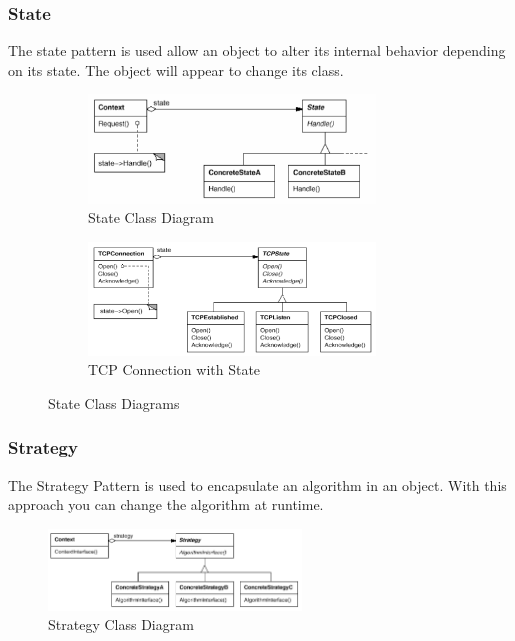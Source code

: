 \documentclass[11pt]{article}
\begin{document}
\subsubsection{State}
\label{sec:orgd97de8c}

The state pattern is used allow an object to alter its internal behavior depending on its state.
The object will appear to change its class.

\begin{figure}[h]
  \centering
  \begin{subfigure}{0.4\textwidth}
    \centering
    \includegraphics[width=3in]{img/state.png}
    \caption{State Class Diagram \label{fig:state-class-diagram}}
  \end{subfigure}
  \hfill
  \begin{subfigure}{0.4\textwidth}
    \centering
    \includegraphics[width=3in]{img/state_example.png}
    \caption{TCP Connection with State \label{fig:tcp-connection-with-state}}
  \end{subfigure}
  \caption{
    \label{fig:state-class-diagrams}
    State Class Diagrams
  }
\end{figure}

\subsubsection{Strategy}
\label{sec:org8bfaa0e}
The Strategy Pattern is used to encapsulate an algorithm in an object.
With this approach you can change the algorithm at runtime.

\begin{figure}[htbp]
\centering
\includegraphics[width=0.6\textwidth]{img/strategy.png}
\caption{\label{fig:strategy-class-diagram}Strategy Class Diagram}
\end{figure}
\end{document}
